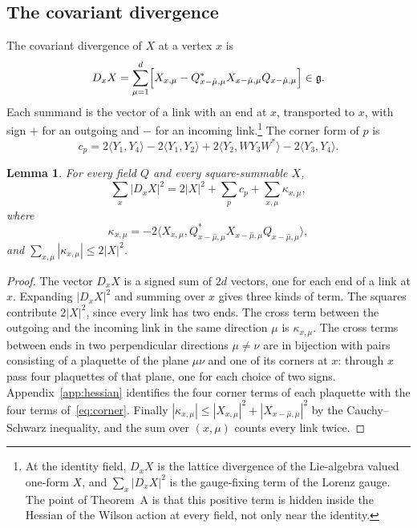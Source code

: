 \documentclass[aps,prd,twocolumn,superscriptaddress,nofootinbib,longbibliography,floatfix,amsmath,amssymb,10pt]{revtex4-2}
\newtheorem{lemma}[theorem]{Lemma}
\theoremstyle{definition}
\theoremstyle{remark}
\newcommand{\g}{\mathfrak{g}}
\newcommand{\ip}[2]{\langle #1,#2\rangle}
\begin{document}
\subsection{The covariant divergence}

The covariant divergence of $X$ at a vertex $x$ is
\begin{equation}\label{eq:divergence}
D_xX=\sum_{\mu=1}^d\Bigl[X_{x,\mu}-Q_{x-\hat\mu,\mu}^*X_{x-\hat\mu,\mu}
Q_{x-\hat\mu,\mu}\Bigr]\in\g .
\end{equation}
Each summand is the vector of a link with an end at $x$, transported to $x$,
with sign $+$ for an outgoing and $-$ for an incoming link.\footnote{At the
identity field, $D_xX$ is the lattice divergence of the Lie-algebra valued
one-form $X$, and $\sum_x|D_xX|^2$ is the gauge-fixing term of the Lorenz
gauge. The point of Theorem~A is that this positive term is hidden inside the
Hessian of the Wilson action at every field, not only near the identity.} The
corner form of $p$ is
\begin{equation}\label{eq:corner}
c_p=2\ip{Y_1}{Y_4}-2\ip{Y_1}{Y_2}+2\ip{Y_2}{WY_3W^*}-2\ip{Y_3}{Y_4}.
\end{equation}

\begin{lemma}\label{lem:divergence}
For every field $Q$ and every square-summable $X$,
\[
\sum_x|D_xX|^2=2|X|^2+\sum_pc_p+\sum_{x,\mu}\kappa_{x,\mu},
\]
where
\[
\kappa_{x,\mu}=-2\bigl\langle X_{x,\mu},Q^*_{x-\hat\mu,\mu}X_{x-\hat\mu,\mu}
Q_{x-\hat\mu,\mu}\bigr\rangle,
\]
and $\sum_{x,\mu}|\kappa_{x,\mu}|\le 2|X|^2$.
\end{lemma}

\begin{proof}
The vector $D_xX$ is a signed sum of $2d$ vectors, one for each end of a link
at $x$. Expanding $|D_xX|^2$ and summing over $x$ gives three kinds of term.
The squares contribute $2|X|^2$, since every link has two ends. The cross
term between the outgoing and the incoming link in the same direction $\mu$
is $\kappa_{x,\mu}$. The cross terms between ends in two perpendicular
directions $\mu\ne\nu$ are in bijection with pairs consisting of a plaquette
of the plane $\mu\nu$ and one of its corners at $x$: through $x$ pass four
plaquettes of that plane, one for each choice of two signs. Appendix~\ref{app:hessian}
identifies the four corner terms of each plaquette with the four terms
of~\eqref{eq:corner}. Finally
$|\kappa_{x,\mu}|\le|X_{x,\mu}|^2+|X_{x-\hat\mu,\mu}|^2$ by the
Cauchy--Schwarz inequality, and the sum over $(x,\mu)$ counts every link
twice.
\end{proof}
\end{document}
